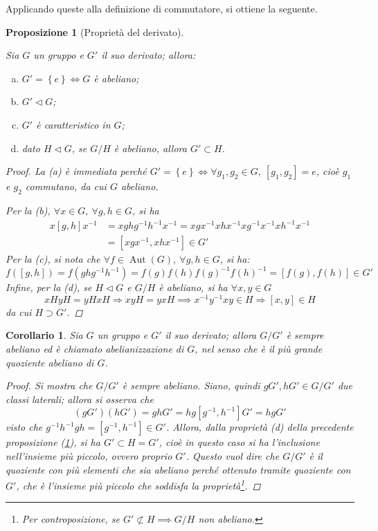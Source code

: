 \documentclass[12pt]{scrartcl}
\theoremstyle{style}
\newtheorem{prop}{Proposizione}[section]
\newtheorem{corollario}{Corollario}[teorema]
\numberwithin{equation}{subsection}
\begin{document}
Applicando queste alla definizione di commutatore, si ottiene la seguente.
\begin{prop}[Propriet\`a del derivato]\label{propderiv}
	
	Sia $G$ un gruppo e $G'$ il suo derivato; allora:
	\begin{enumerate}[(a).]
		\item $G ' = \left\{ e \right\}  \iff G$ \`e abeliano;
		\item $G' \lhd G$;
		\item $G'$ \`e caratteristico in $G$;
		\item dato $H \lhd G$, se $G / H$ \`e abeliano, allora $G' \subset H$.
	\end{enumerate}
	\begin{proof}
		La (a) \`e immediata perch\'e $G' = \left\{ e \right\} \iff \forall g_1,g_2 \in G, \ [g_1,g_2] = e $, cio\`e $g_1$ e $g_2$ commutano, da cui $G$ abeliano.

		Per la (b), $\forall x \in G, \ \forall g,h \in G $, si ha 
		\[
			\begin{split}
				x[g,h]x^{-1}  &= xghg^{-1}h^{-1}x^{-1}= xgx^{-1}xhx^{-1}xg^{-1}x^{-1}xh^{-1}x^{-1}\\
					      &=[xgx^{-1}, xhx^{-1}] \in G'
			\end{split}
		\] 
	Per la (c), si nota che $\forall f \in \operatorname{Aut} (G), \ \forall g,h \in G$, si ha:
	\[
		f([g,h]) = f(ghg^{-1}h^{-1}) = f(g) f(h) f(g)^{-1} f(h)^{-1} = [f(g), f(h)] \in G'
	\] 
	Infine, per la (d), se $H \lhd G$ e $G / H$ \`e abeliano, si ha $\forall x,y \in G$
	\[
		xHyH =yH xH\Rightarrow xyH = yxH \implies x^{-1}y^{-1}xy \in H \Rightarrow [x,y] \in H
	\] 
	da cui $H \supset G' $.
	\end{proof}
\end{prop}
\begin{corollario}
	Sia $G$ un gruppo e $G'$ il suo derivato; allora $G / G'$ \`e sempre abeliano ed \`e chiamato \textit{abelianizzazione} di $G$, nel senso che \`e il pi\`u grande quoziente abeliano di $G$.
	\begin{proof}
		Si mostra che $G / G'$ \`e sempre abeliano. 
		Siano, quindi $gG', hG' \in G / G'$ due classi laterali; allora si osserva che
		\[
			(gG') (hG') = ghG' = hg [g^{-1},h^{-1}] G' = hg G'
		\] 
		visto che $g^{-1}h^{-1}gh=[g^{-1},h^{-1}] \in G'$.
		Allora, dalla propriet\`a (d) della precedente proposizione (\ref{propderiv}), si ha $G' \subset H =G'$, cio\`e in questo caso si ha l'inclusione nell'insieme pi\`u piccolo, ovvero proprio $G'$. 
		Questo vuol dire che $G /G'$ \`e il quoziente con pi\`u elementi che sia abeliano perch\'e ottenuto tramite quoziente con $G'$, che \`e l'insieme pi\`u piccolo che soddisfa la propriet\`a\footnote{Per controposizione, se $G'\not\subset H\implies G/H$ non abeliano.}.
	\end{proof}
\end{corollario}
\end{document}
